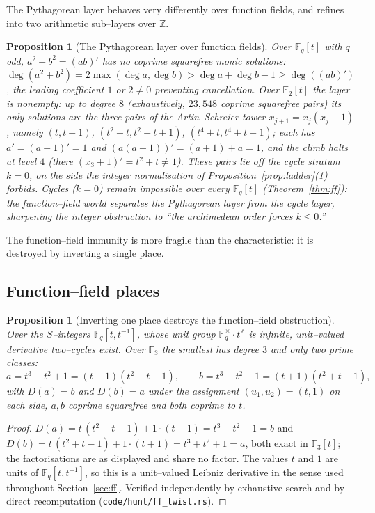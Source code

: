 \documentclass[11pt]{article}
\newtheorem{proposition}[theorem]{Proposition}
\theoremstyle{definition}
\begin{document}
The Pythagorean layer behaves very differently over function fields, and refines into two arithmetic
sub--layers over $\mathbb{Z}$.

\begin{proposition}[The Pythagorean layer over function fields]\label{prop:ff-pyth}
Over $\mathbb{F}_q[t]$ with $q$ odd, $a^2+b^2=(ab)'$ has no coprime squarefree monic solutions:
$\deg(a^2+b^2)=2\max(\deg a,\deg b)>\deg a+\deg b-1\ge\deg((ab)')$, the leading coefficient $1$ or
$2\ne0$ preventing cancellation. Over $\mathbb{F}_2[t]$ the layer is nonempty: up to degree $8$
(exhaustively, $23{,}548$ coprime squarefree pairs) its only solutions are the three pairs of the
Artin--Schreier tower $x_{j+1}=x_j(x_j+1)$, namely $(t,t+1)$, $(t^2+t,t^2+t+1)$, $(t^4+t,t^4+t+1)$;
each has $a'=(a+1)'=1$ and $(a(a+1))'=(a+1)+a=1$, and the climb halts at level $4$ (there
$(x_3+1)'=t^2+t\ne1$). These pairs lie off the cycle stratum $k=0$, on the side the integer
normalisation of Proposition~\ref{prop:ladder}(1) forbids. Cycles ($k=0$) remain impossible over every
$\mathbb{F}_q[t]$ (Theorem~\ref{thm:ff}): the function--field world separates the Pythagorean layer
from the cycle layer, sharpening the integer obstruction to ``the archimedean order forces $k\le0$.''
\end{proposition}

The function--field immunity is more fragile than the characteristic: it is destroyed by inverting
a single place.

\subsection{Function--field places}\label{ssec:ffplaces}

\begin{proposition}[Inverting one place destroys the function--field obstruction]\label{prop:ffsunit}
Over the $S$--integers $\mathbb{F}_q[t,t^{-1}]$, whose unit group $\mathbb{F}_q^\times\cdot t^{\mathbb{Z}}$
is infinite, unit--valued derivative two--cycles exist. Over $\mathbb{F}_3$ the smallest has degree
$3$ and only \emph{two} prime classes:
\[ a=t^3+t^2+1=(t-1)(t^2-t-1),\qquad b=t^3-t^2-1=(t+1)(t^2+t-1), \]
with $D(a)=b$ and $D(b)=a$ under the assignment $(u_1,u_2)=(t,1)$ on each side, $a,b$ coprime
squarefree and both coprime to $t$.
\end{proposition}
\begin{proof}
$D(a)=t\,(t^2-t-1)+1\cdot(t-1)=t^3-t^2-1=b$ and $D(b)=t\,(t^2+t-1)+1\cdot(t+1)=t^3+t^2+1=a$, both
exact in $\mathbb{F}_3[t]$; the factorisations are as displayed and share no factor. The values
$t$ and $1$ are units of $\mathbb{F}_q[t,t^{-1}]$, so this is a unit--valued Leibniz derivative in
the sense used throughout Section~\ref{sec:ff}. Verified independently by exhaustive search and by
direct recomputation (\texttt{code/hunt/ff\_twist.rs}).
\end{proof}
\end{document}
